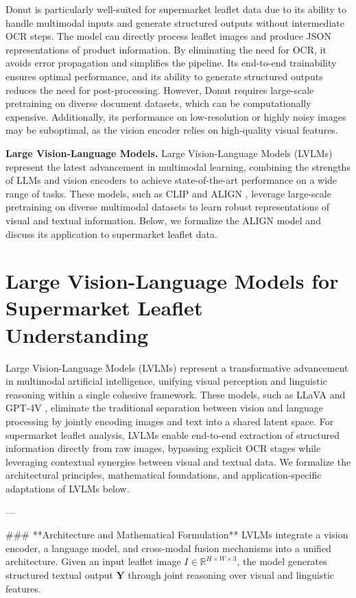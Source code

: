 \documentclass[11pt]{article}
\begin{document}
Donut is particularly well-suited for supermarket leaflet data due to its ability to handle multimodal inputs and generate structured outputs without intermediate OCR steps. The model can directly process leaflet images and produce JSON representations of product information. By eliminating the need for OCR, it avoids error propagation and simplifies the pipeline. Its end-to-end trainability ensures optimal performance, and its ability to generate structured outputs reduces the need for post-processing. However, Donut requires large-scale pretraining on diverse document datasets, which can be computationally expensive. Additionally, its performance on low-resolution or highly noisy images may be suboptimal, as the vision encoder relies on high-quality visual features.

\indent\textbf{Large Vision-Language Models.} Large Vision-Language Models (LVLMs) represent the latest advancement in multimodal learning, combining the strengths of LLMs and vision encoders to achieve state-of-the-art performance on a wide range of tasks. These models, such as CLIP \cite{radford2021clip} and ALIGN \cite{li2022align}, leverage large-scale pretraining on diverse multimodal datasets to learn robust representations of visual and textual information. Below, we formalize the ALIGN model and discuss its application to supermarket leaflet data.

\section{Large Vision-Language Models for Supermarket Leaflet Understanding}  
Large Vision-Language Models (LVLMs) represent a transformative advancement in multimodal artificial intelligence, unifying visual perception and linguistic reasoning within a single cohesive framework. These models, such as LLaVA \cite{liu2023llava} and GPT-4V \cite{openai2023gpt4}, eliminate the traditional separation between vision and language processing by jointly encoding images and text into a shared latent space. For supermarket leaflet analysis, LVLMs enable end-to-end extraction of structured information directly from raw images, bypassing explicit OCR stages while leveraging contextual synergies between visual and textual data. We formalize the architectural principles, mathematical foundations, and application-specific adaptations of LVLMs below.

---

### **Architecture and Mathematical Formulation**  
LVLMs integrate a vision encoder, a language model, and cross-modal fusion mechanisms into a unified architecture. Given an input leaflet image \( I \in \mathbb{R}^{H \times W \times 3} \), the model generates structured textual output \( \mathbf{Y} \) through joint reasoning over visual and linguistic features.
\end{document}
